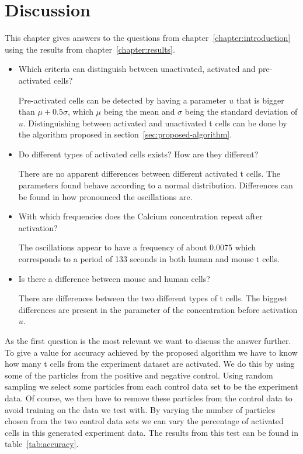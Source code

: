 \chapter{Discussion}
\label{chapter:conclusion}

This chapter gives answers to the questions from chapter~\ref{chapter:introduction} using the results from chapter~\ref{chapter:results}. 

\begin{itemize}
	\item Which criteria can distinguish between unactivated, activated and pre-activated cells?
	
	Pre-activated cells can be detected by having a parameter $u$ that is bigger than $\mu + 0.5 \sigma$, which $\mu$ being the mean and $\sigma$ being the standard deviation of $u$. Distinguishing between activated and unactivated t cells can be done by the algorithm proposed in section~\ref{sec:proposed-algorithm}.
	\item Do different types of activated cells exists? How are they different?
	
	There are no apparent differences between different activated t cells. The parameters found behave according to a normal distribution. Differences can be found in how pronounced the oscillations are.
	\item With which frequencies does the Calcium concentration repeat after activation?
	
	The oscillations appear to have a frequency of about 0.0075 which corresponds to a period of 133 seconds in both human and mouse t cells.
	\item Is there a difference between mouse and human cells?
	
	There are differences between the two different types of t cells. The biggest differences are present in the parameter of the \Calcium concentration before activation $u$.
\end{itemize}

As the first question is the most relevant we want to discuss the answer further. To give a value for accuracy achieved by the proposed algorithm we have to know how many t cells from the experiment dataset are activated. We do this by using some of the particles from the positive and negative control. Using random sampling we select some particles from each control data set to be the experiment data. Of course, we then have to remove these particles from the control data to avoid training on the data we test with. By varying the number of particles chosen from the two control data sets we can vary the percentage of activated cells in this generated experiment data. The results from this test can be found in table~\ref{tab:accuracy}.


